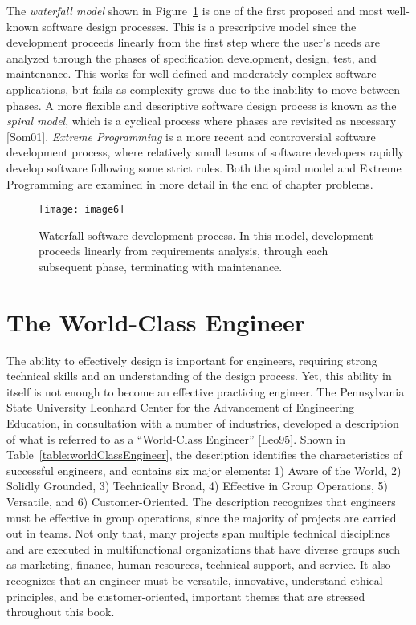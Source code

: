 The \emph{waterfall model} shown in Figure~\ref{figure:waterfallDesignProcess} 
is one of the first
proposed and most well-known software design processes. This is a
prescriptive model since the development proceeds linearly from the
first step where the user's needs are analyzed through the phases of
specification development, design, test, and maintenance. This works for
well-defined and moderately complex software applications, but fails as
complexity grows due to the inability to move between phases. A more
flexible and descriptive software design process is known as the
\emph{spiral model}, which is a cyclical process where phases are
revisited as necessary {[}Som01{]}. \emph{Extreme Programming} is a more
recent and controversial software development process, where relatively
small teams of software developers rapidly develop software following
some strict rules. Both the spiral model and Extreme Programming are
examined in more detail in the end of chapter problems.

\begin{figure}[h]
 \texttt{[image: image6]}
\caption{Waterfall software development process. In this
model, development proceeds linearly from requirements analysis, through
each subsequent phase, terminating with maintenance.}
\label{figure:waterfallDesignProcess}
\end{figure}

\section{The World-Class Engineer}\label{the-world-class-engineer}

The ability to effectively design is important for engineers, requiring
strong technical skills and an understanding of the design process. Yet,
this ability in itself is not enough to become an effective practicing
engineer. The Pennsylvania State University Leonhard Center for the
Advancement of Engineering Education, in consultation with a number of
industries, developed a description of what is referred to as a
``World-Class Engineer'' {[}Leo95{]}. Shown in Table~\ref{table:worldClassEngineer},
 the description identifies the characteristics of successful engineers, and
contains six major elements: 1) Aware of the World, 2) Solidly Grounded,
3) Technically Broad, 4) Effective in Group Operations, 5) Versatile,
and 6) Customer-Oriented. The description recognizes that engineers must
be effective in group operations, since the majority of projects are
carried out in teams. Not only that, many projects span multiple
technical disciplines and are executed in multifunctional organizations
that have diverse groups such as marketing, finance, human resources,
technical support, and service. It also recognizes that an engineer must
be versatile, innovative, understand ethical principles, and be
customer-oriented, important themes that are stressed throughout this
book.

